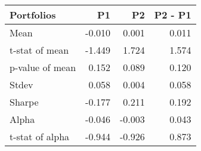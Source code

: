 \begin{tabular}{lrrr}
\toprule
Portfolios & P1 & P2 & P2 - P1 \\
\midrule
Mean & -0.010 & 0.001 & 0.011 \\
t-stat of mean & -1.449 & 1.724 & 1.574 \\
p-value of mean & 0.152 & 0.089 & 0.120 \\
Stdev & 0.058 & 0.004 & 0.058 \\
Sharpe & -0.177 & 0.211 & 0.192 \\
Alpha & -0.046 & -0.003 & 0.043 \\
t-stat of alpha & -0.944 & -0.926 & 0.873 \\
\bottomrule
\end{tabular}
